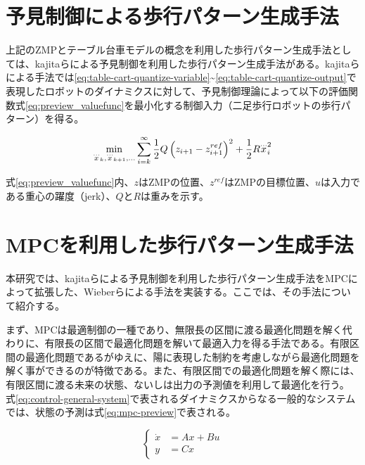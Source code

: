 \newpage

\section{予見制御による歩行パターン生成手法}
上記のZMPとテーブル台車モデルの概念を利用した歩行パターン生成手法としては、kajitaらによる予見制御を利用した歩行パターン生成手法\cite{PREVIEW}がある。kajitaらによる手法では\eqref{eq:table-cart-quantize-variable}\textasciitilde\eqref{eq:table-cart-quantize-output}で表現したロボットのダイナミクスに対して、予見制御理論によって以下の評価関数式\eqref{eq:preview_valuefunc}を最小化する制御入力（二足歩行ロボットの歩行パターン）を得る。

\begin{equation}
  \min_{{\buildrel\ldots\over{x}}_{k},{\buildrel\ldots\over{x}}_{k+1},\ldots}\sum_{i=k}^{\infty}{1\over 2}Q\left(z_{i+1}-z_{i+1}^{ref}\right)^{2}+{1\over 2}R{\buildrel\ldots\over{x}}_{i}^{2}
  \label{eq:preview_valuefunc}
\end{equation}

式\eqref{eq:preview_valuefunc}内、$z$はZMPの位置、$z^{ref}$はZMPの目標位置、$u$は入力である重心の躍度（jerk）、$Q$と$R$は重みを示す。

\section{MPCを利用した歩行パターン生成手法}
本研究では、kajitaらによる予見制御を利用した歩行パターン生成手法\cite{PREVIEW}をMPCによって拡張した、Wieberらによる手法\cite{WIEBER}を実装する。ここでは、その手法\cite{WIEBER}について紹介する。

まず、MPCは最適制御の一種であり、無限長の区間に渡る最適化問題を解く代わりに、有限長の区間で最適化問題を解いて最適入力を得る手法である。有限区間の最適化問題であるがゆえに、陽に表現した制約を考慮しながら最適化問題を解く事ができるのが特徴である。また、有限区間での最適化問題を解く際には、有限区間に渡る未来の状態、ないしは出力の予測値を利用して最適化を行う。
式\eqref{eq:control-general-system}で表されるダイナミクスからなる一般的なシステムでは、状態の予測は式\eqref{eq:mpc-preview}で表される。

\begin{equation}
  \begin{cases}
    \dot{x} & = Ax + Bu \\
    y       & = Cx
  \end{cases}
  \label{eq:control-general-system}
\end{equation}

